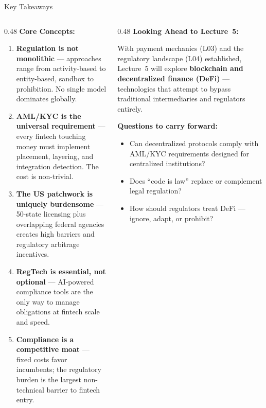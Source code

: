\documentclass[aspectratio=169, 11pt]{beamer}
\begin{document}
\begin{frame}{Key Takeaways}
  \begin{columns}[T]
    \begin{column}{0.48\textwidth}
      \textcolor{mlpurple}{\textbf{Core Concepts:}}

      \vspace{0.4em}
      \begin{enumerate}
        \item \textbf{Regulation is not monolithic} --- approaches range from
              activity-based to entity-based, sandbox to prohibition.
              No single model dominates globally.
        \item \textbf{AML/KYC is the universal requirement} --- every fintech
              touching money must implement placement, layering, and
              integration detection. The cost is non-trivial.
        \item \textbf{The US patchwork is uniquely burdensome} --- 50-state
              licensing plus overlapping federal agencies creates high
              barriers and regulatory arbitrage incentives.
        \item \textbf{RegTech is essential, not optional} --- AI-powered
              compliance tools are the only way to manage obligations
              at fintech scale and speed.
        \item \textbf{Compliance is a competitive moat} --- fixed costs
              favor incumbents; the regulatory burden is the largest
              non-technical barrier to fintech entry.
      \end{enumerate}
    \end{column}
    \begin{column}{0.48\textwidth}
      \textcolor{mlpurple}{\textbf{Looking Ahead to Lecture~5:}}

      \vspace{0.4em}
      With payment mechanics (L03) and the regulatory landscape (L04)
      established, Lecture~5 will explore \textbf{blockchain and
      decentralized finance (DeFi)} --- technologies that attempt to
      bypass traditional intermediaries and regulators entirely.

      \vspace{0.5em}
      \textbf{Questions to carry forward:}
      \begin{itemize}
        \item Can decentralized protocols comply with AML/KYC requirements
              designed for centralized institutions?
        \item Does ``code is law'' replace or complement legal regulation?
        \item How should regulators treat DeFi --- ignore, adapt, or
              prohibit?
      \end{itemize}


\end{column}
\end{columns}
\end{frame}
\end{document}
